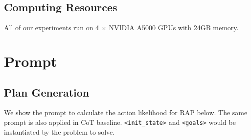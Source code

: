 \subsection{Computing Resources}
All of our experiments run on 4 $\times$ NVIDIA A5000 GPUs with 24GB memory.

\section{Prompt}
\label{sec:prompt}
\subsection{Plan Generation}
\label{sec:bw_prompt}
We show the prompt to calculate the action likelihood for RAP below. The same prompt is also applied in CoT baseline. \texttt{<init\_state>} and \texttt{<goals>} would be instantiated by the problem to solve.
